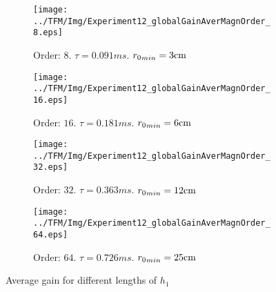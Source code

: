 \begin{figure}[h]
	\centering
	\begin{subfigure}[b]{0.45\textwidth}
		\centering
		\texttt{[image: ../TFM/Img/Experiment12\_globalGainAverMagnOrder\_8.eps]}
		\caption{Order: $8$. $\tau = 0.091 \si{ms}$. ${\distLinePrimSource}_{min} = 3\si{cm}$}
	\end{subfigure}
	\begin{subfigure}[b]{0.45\textwidth}
		\centering
		\texttt{[image: ../TFM/Img/Experiment12\_globalGainAverMagnOrder\_16.eps]}
		\caption{Order: $16$. $\tau = 0.181 \si{ms}$. ${\distLinePrimSource}_{min} = 6\si{cm}$}
	\end{subfigure}
	\begin{subfigure}[b]{0.45\textwidth}
		\centering
		\texttt{[image: ../TFM/Img/Experiment12\_globalGainAverMagnOrder\_32.eps]}
		\caption{Order: $32$. $\tau = 0.363 \si{ms}$. ${\distLinePrimSource}_{min} = 12\si{cm}$}
	\end{subfigure}
	\begin{subfigure}[b]{0.45\textwidth}
		\centering
		\texttt{[image: ../TFM/Img/Experiment12\_globalGainAverMagnOrder\_64.eps]}
		\caption{Order: $64$. $\tau = 0.726 \si{ms}$. ${\distLinePrimSource}_{min} = 25\si{cm}$}
	\end{subfigure}
	
	\caption{Average gain for different lengths of $h_1$}
	\label{gainAverDifMagFilterLength}
\end{figure}


